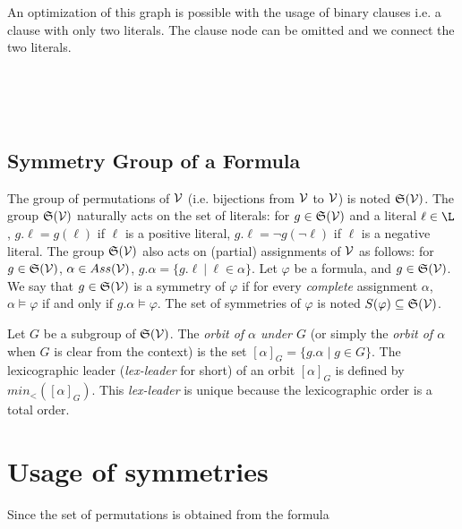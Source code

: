 An optimization of this graph is possible with the usage of binary clauses i.e. a clause with only two literals.
The clause node can be omitted and we connect the two literals. 

\\

\\

\\

 

\subsection{Symmetry Group of a Formula}

The group of permutations of $\mathcal{V}$ (i.e. bijections from $\mathcal{V}$ to $\mathcal{V}$) is noted
$\mathfrak{S}(\mathcal{V})$. The group $\mathfrak{S}(\mathcal{V})$ naturally acts on the set of literals: for $g
\in \mathfrak{S}(\mathcal{V})$ and a literal $\ell \in \L $, $g.\ell = g(\ell)$ if $\ell$ is a
positive literal, $g.\ell = \neg g(\neg \ell)$ if $\ell$ is a negative literal.
The group $\mathfrak{S}(\mathcal{V})$ also acts on (partial) assignments of $\mathcal{V}$ as follows: for
$g \in \mathfrak{S}(\mathcal{V})$, $\alpha \in Ass(\mathcal{V})$, $g.\alpha = \{ g.\ell ~|~ \ell \in \alpha \}$. Let
$\varphi$ be a formula, and $g \in \mathfrak{S}(\mathcal{V})$. We say that $g\in \mathfrak{S}(\mathcal{V})$ is a
symmetry of $ \varphi$ if for every \emph{complete} assignment $\alpha$, $\alpha
\models \varphi$ if and only if $g.\alpha \models \varphi$. The set of symmetries
of $\varphi$ is noted $S(\varphi) \subseteq \mathfrak{S}(\mathcal{V})$.

Let $G$ be a subgroup of $\mathfrak{S}(\mathcal{V})$. The \emph{orbit of $\alpha$ under $G$} (or
simply the \emph{orbit of $\alpha$} when $G$ is clear from the context) is the set
$ [\alpha]_G=\{ g.\alpha \mid g \in G \}$. The lexicographic leader
(\textit{lex-leader} for short) of an orbit $[\alpha]_G$ is defined by
$min_<([\alpha]_G)$. This \textit{lex-leader} is unique because the lexicographic
order is a total order.


\section{Usage of symmetries}

Since the set of permutations is obtained from the formula

